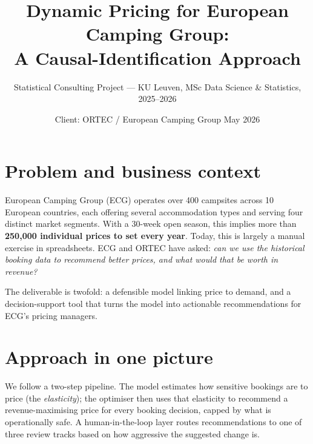 \documentclass[11pt,a4paper]{article}
\title{Dynamic Pricing for European Camping Group:\\ A Causal-Identification Approach}
\author{Statistical Consulting Project --- KU Leuven, MSc Data Science \& Statistics, 2025--2026}
\date{Client: ORTEC / European Camping Group \quad\textbar\quad May 2026}
\begin{document}
\maketitle

\vspace{-1em}

\section{Problem and business context}

European Camping Group (ECG) operates over 400 campsites across 10 European countries, each offering several accommodation types and serving four distinct market segments. With a 30-week open season, this implies more than \textbf{250{,}000 individual prices to set every year}. Today, this is largely a manual exercise in spreadsheets. ECG and ORTEC have asked: \emph{can we use the historical booking data to recommend better prices, and what would that be worth in revenue?}

The deliverable is twofold: a defensible model linking price to demand, and a decision-support tool that turns the model into actionable recommendations for ECG's pricing managers.

\section{Approach in one picture}

We follow a two-step pipeline. The model estimates how sensitive bookings are to price (the \emph{elasticity}); the optimiser then uses that elasticity to recommend a revenue-maximising price for every booking decision, capped by what is operationally safe. A human-in-the-loop layer routes recommendations to one of three review tracks based on how aggressive the suggested change is.
\end{document}

